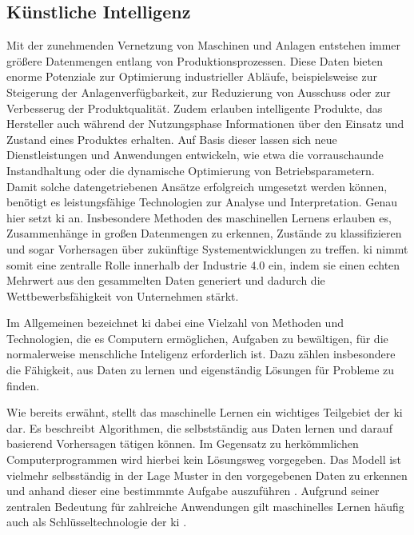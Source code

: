 \subsection{Künstliche Intelligenz}
Mit der zunehmenden Vernetzung von Maschinen und Anlagen entstehen immer größere Datenmengen entlang von Produktionsprozessen.
Diese Daten bieten enorme Potenziale zur Optimierung industrieller Abläufe, beispielsweise zur Steigerung der Anlagenverfügbarkeit, zur Reduzierung von Ausschuss oder zur Verbesserug der Produktqualität.
Zudem erlauben intelligente Produkte, das Hersteller auch während der Nutzungsphase Informationen über den Einsatz und Zustand eines Produktes erhalten.
Auf Basis dieser lassen sich neue Dienstleistungen und Anwendungen entwickeln, wie etwa die vorrauschaunde Instandhaltung oder die dynamische Optimierung von Betriebsparametern.
Damit solche datengetriebenen Ansätze erfolgreich umgesetzt werden können, benötigt es leistungsfähige Technologien zur Analyse und Interpretation.
Genau hier setzt \acs{ki} an.
Insbesondere Methoden des maschinellen Lernens erlauben es, Zusammenhänge in großen Datenmengen zu erkennen, Zustände zu klassifizieren und sogar Vorhersagen über zukünftige Systementwicklungen zu treffen. \cite{KIEinführung} 
\acs{ki} nimmt somit eine zentralle Rolle innerhalb der Industrie 4.0 ein, indem sie einen echten Mehrwert aus den gesammelten Daten generiert und dadurch die Wettbewerbsfähigkeit von Unternehmen stärkt.

Im Allgemeinen bezeichnet \acs{ki} dabei eine Vielzahl von Methoden und Technologien, die es Computern ermöglichen, Aufgaben zu bewältigen, für die normalerweise menschliche Inteligenz erforderlich ist.
Dazu zählen insbesondere die Fähigkeit, aus Daten zu lernen und eigenständig Lösungen für Probleme zu finden. \cite{KIDefinition}

Wie bereits erwähnt, stellt das maschinelle Lernen ein wichtiges Teilgebiet der \acs{ki} dar.
Es beschreibt Algorithmen, die selbstständig aus Daten lernen und darauf basierend Vorhersagen tätigen können.
Im Gegensatz zu herkömmlichen Computerprogrammen wird hierbei kein Lösungsweg vorgegeben. 
Das Modell ist vielmehr selbsständig in der Lage Muster in den vorgegebenen Daten zu erkennen und anhand dieser eine bestimmmte Aufgabe auszuführen  \cite{MLDefinition}.
Aufgrund seiner zentralen Bedeutung für zahlreiche Anwendungen gilt maschinelles Lernen häufig auch als Schlüsseltechnologie der \acs{ki} \cite{MLSchlüsseltechnologie}. 

